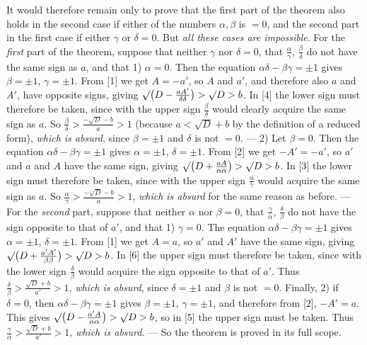 It would therefore remain only to prove that the first part of the theorem also holds in the second case if either of the numbers $\alpha,\beta$ is $=0$, and the second part in the first case if either $\gamma$ or $\delta=0$. But \textit{all these cases are impossible}. For the \textit{first} part of the theorem, suppose that neither $\gamma$ nor $\delta=0$, that $\frac{\alpha}{\gamma}$, $\frac{\beta}{\delta}$ do not have the same sign as $a$, and that 1) $\alpha=0$. Then the equation $\alpha\delta-\beta\gamma=\pm1$ gives $\beta=\pm1$, $\gamma=\pm1$. From [1] we get $A=-a'$, so $A$ and $a'$, and therefore also $a$ and $A'$, have opposite signs, giving $\surd\bigl(D-\frac{aA'}{\delta\delta}\bigr)>\surd D>b$. In [4] the lower sign must therefore be taken, since with the upper sign $\frac{\beta}{\delta}$ would clearly acquire the same sign as $a$. So $\frac{\beta}{\delta}>\frac{-\surd D-b}{a}>1$ (because $a<\surd D+b$ by the definition of a reduced form), \textit{which is absurd}, since $\beta=\pm1$ and $\delta$ is not $=0$. --- 2) Let $\beta=0$. Then the equation $\alpha\delta-\beta\gamma=\pm1$ gives $\alpha=\pm1$, $\delta=\pm1$. From [2] we get $-A'=-a'$, so $a'$ and $a$ and $A$ have the same sign, giving ${\surd\bigl(D+\frac{aA}{\alpha\alpha}\bigr)}>\surd D>b$. In [3] the lower sign must therefore be taken, since with the upper sign $\frac{\alpha}{\gamma}$ would acquire the same sign as $a$. So $\frac{\alpha}{\gamma}>\frac{-\surd D-b}{a}>1$, \textit{which is absurd} for the same reason as before. --- For the \textit{second} part, suppose that neither $\alpha$ nor $\beta=0$, that $\frac{\gamma}{\alpha}$, $\frac{\delta}{\beta}$ do not have the sign opposite to that of $a'$, and that 1) $\gamma=0$. The equation $\alpha\delta-\beta\gamma=\pm1$ gives $\alpha=\pm1$, $\delta=\pm1$. From [1] we get $A=a$, so $a'$ and $A'$ have the same sign, giving $\surd\bigl(D+\frac{a'A'}{\beta\beta}\bigr)>\surd D>b$. In [6] the upper sign must therefore be taken, since with the lower sign $\frac{\delta}{\beta}$ would acquire the sign opposite to that of $a'$. Thus $\frac{\delta}{\beta}>\frac{\surd D+b}{a'}>1$, \textit{which is absurd}, since $\delta=\pm1$ and $\beta$ is not $=0$. Finally, 2) if $\delta=0$, then $\alpha\delta-\beta\gamma=\pm1$ gives $\beta=\pm1$, $\gamma=\pm1$, and therefore from [2], $-A'=a$. This gives $\surd\bigl(D-\frac{a'A}{\alpha\alpha}\bigr)>\surd D>b$, so in [5] the upper sign must be taken. Thus $\frac{\gamma}{\alpha}>\frac{\surd D+b}{a'}>1$, \textit{which is absurd}. --- So the theorem is proved in its full scope.

